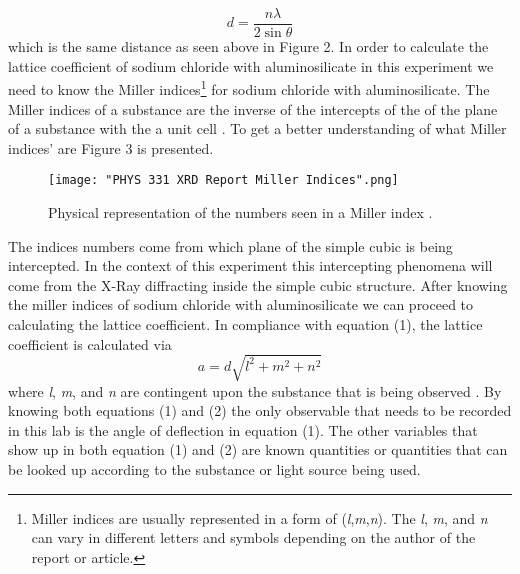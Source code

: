 \documentclass[twocolumn]{article}
\begin{document}
\begin{equation}\label{1}
d=\frac{n\lambda}{2\sin{\theta}}
\end{equation}
which is the same distance as seen above in Figure 2. In order to calculate the lattice coefficient of sodium chloride with aluminosilicate in this experiment we need to know the Miller indices\footnote{Miller indices are usually represented in a form of (\textit{l},\textit{m},\textit{n}). The \textit{l}, \textit{m}, and \textit{n} can vary in different letters and symbols depending on the author of the report or article.} for sodium chloride with aluminosilicate. The Miller indices of a substance are the inverse of the intercepts of the of the plane of a substance with the a unit cell \cite{WikiCrystal}. To get a better understanding of what Miller indices' are Figure 3 is presented.
\begin{figure}[htbp]
\begin{center}
\texttt{[image: "PHYS 331 XRD Report Miller Indices".png]}
\caption{Physical representation of the numbers seen in a Miller index \cite{WikiCrystal}.}
\label{Fig3}
\end{center}
\end{figure}
\newpage
The indices numbers come from which plane of the simple cubic is being intercepted. In the context of this experiment this intercepting phenomena will come from the X-Ray diffracting inside the simple cubic structure. After knowing the miller indices of sodium chloride with aluminosilicate we can proceed to calculating the lattice coefficient. In compliance with equation (1), the lattice coefficient is calculated via
\begin{equation}\label{2}
a=d\sqrt{l^2+m^2+n^2}
\end{equation}
where \textit{l}, \textit{m}, and \textit{n} are contingent upon the substance that is being observed \cite{X-RayCryst}. By knowing both equations (1) and (2) the only observable that needs to be recorded in this lab is the angle of deflection in equation (1). The other variables that show up in both equation (1) and (2) are known quantities or quantities that can be looked up according to the substance or light source being used.
\end{document}
